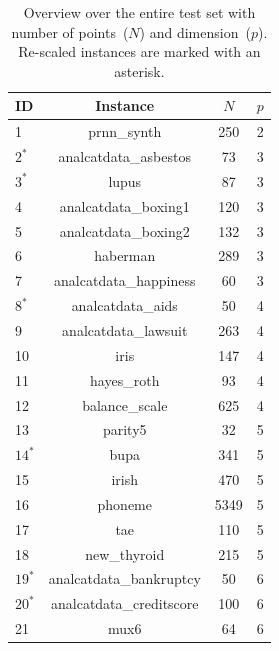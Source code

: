 \documentclass[a4paper,american,reqno]{amsart}
\newcommand{\rev}[1]{#1}
\begin{document}
\begin{center}
  \begin{longtable}{l c c c }
    \caption{Overview over the entire test set with number of
      points~($N$) and dimension~($p$). \rev{Re-scaled instances are
        marked with an asterisk.}}
    \label{table1}\\
    \toprule
    ID & Instance  &$ N $ &$p$ \\
    \midrule
    1                         & prnn\_synth         & 250          & 2   \\
    $2^*$   &  analcatdata\_asbestos        &  73    &  3   \\
    $3^*$    &  lupus                        &  87    &  3  \\
    4     &  analcatdata\_boxing1         &  120   &  3  \\
    5       &  analcatdata\_boxing2         &  132   &  3   \\
    6        &  haberman     &  289   &  3     \\
    7        &  analcatdata\_happiness       &  60    &  3  \\
    $8^*$     &  analcatdata\_aids            &  50    &  4  \\
    9  &  analcatdata\_lawsuit         &  263   &  4  \\
    10     &  iris       &  147   &  4 \\
    11          &  hayes\_roth        &  93    &  4 \\
    12       &  balance\_scale               &  625   &  4 \\
    13       &  parity5     &  32    &  5  \\
    $14^*$        &  bupa                         &  341   &  5  \\
    15        &  irish                        &  470   &  5 \\
    16         &  phoneme       &  5349  &  5  \\
    17                        &  tae                          &  110   &  5  \\
    18                        &  new\_thyroid                 &  215   &  5  \\
    $19^*$                        &  analcatdata\_bankruptcy      &  50    &  6 \\
    $20^*$                        &  analcatdata\_creditscore     &  100   &  6  \\
    21                        &  mux6       &  64    &  6 \\

\end{longtable}
\end{center}
\end{document}
